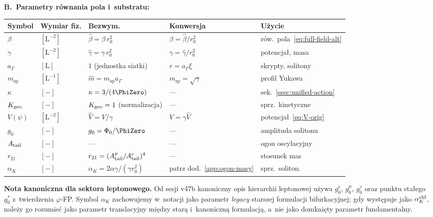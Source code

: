 \medskip\noindent
\textbf{B.~Parametry r\'ownania pola i~substratu:}

\begin{center}
\begin{tabular}{@{}lllll@{}}
\toprule
\textbf{Symbol} & \textbf{Wymiar fiz.} & \textbf{Bezwym.} & \textbf{Konwersja} & \textbf{U\.zycie} \\
\midrule
$\beta$ & $[\mathrm{L}^{-2}]$ & $\hat\beta = \beta\,r_0^2$ & $\beta = \hat\beta/r_0^2$ & r\'ow.~pola~\eqref{eq:full-field-alt} \\
$\gamma$ & $[\mathrm{L}^{-2}]$ & $\hat\gamma = \gamma\,r_0^2$ & $\gamma = \hat\gamma/r_0^2$ & potencja\l{}, masa \\
$a_\Gamma$ & $[\mathrm{L}]$ & $1$ (jednostka siatki) & $r = a_\Gamma \xi$ & skrypty, solitony \\
$m_{\mathrm{sp}}$ & $[\mathrm{L}^{-1}]$ & $\hat m = m_{\mathrm{sp}} a_\Gamma$ & $m_{\mathrm{sp}} = \sqrt{\gamma}$ & profil Yukawa \\
$\kappa$ & $[-]$ & $\kappa = 3/(4\PhiZero)$ & --- & sek.~\ref{ssec:unified-action} \\
$K_{\rm geo}$ & $[-]$ & $K_{\rm geo} = 1$ (normalizacja) & --- & sprz.~kinetyczne \\
$V(\psi)$ & $[\mathrm{L}^{-2}]$ & $\hat V = V/\gamma$ & $V = \gamma\hat V$ & potencja\l{}~\eqref{eq:V-orig} \\
$g_0$ & $[-]$ & $g_0 = \Phi_0/\PhiZero$ & --- & amplituda solitonu \\
$A_{\rm tail}$ & $[-]$ & --- & --- & ogon oscylacyjny \\
$r_{21}$ & $[-]$ & $r_{21} = (A_{\rm tail}^\mu/A_{\rm tail}^e)^4$ & --- & stosunek mas \\
$\alpha_K$ & $[-]$ & $\alpha_K = 2\alpha\gamma/(\gamma r_0^2)$ & patrz dod.~\ref{app:ogon-masy} & sprz.~soliton. \\
\bottomrule
\end{tabular}
\end{center}

\medskip\noindent
\textbf{Nota kanoniczna dla sektora leptonowego.}
Od sesji v47b kanoniczny opis hierarchii leptonowej u\.zywa
$g_0^e$, $g_0^\mu$, $g_0^\tau$ oraz punktu sta\l{}ego
$g_0^*$ z~twierdzenia $\varphi$-FP.
Symbol $\alpha_K$ zachowujemy w~notacji jako parametr
\emph{legacy} starszej formulacji bifurkacyjnej;
gdy wyst\k{e}puje jako $\alpha_K^{\rm old}$, nale\.zy go rozumie\'c
jako parametr translacyjny mi\k{e}dzy star\k{a} i~kanoniczn\k{a}
formulacj\k{a}, a~nie jako domkni\k{e}ty parametr fundamentalny.

